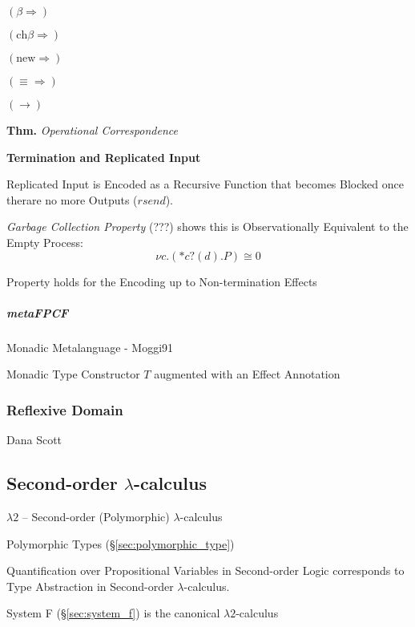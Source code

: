 $(\beta\Rightarrow)$

$(\text{ch}\beta\Rightarrow)$

$(\text{new}\Rightarrow)$

$(\equiv\Rightarrow)$

$(\rightarrow)$

\textbf{Thm.} \emph{Operational Correspondence}


\textbf{Termination and Replicated Input}

Replicated Input is Encoded as a Recursive Function that becomes
Blocked once therare no more Outputs ($rsend$).

\emph{Garbage Collection Property} (???) shows this is Observationally
Equivalent to the Empty Process:
\[
  \nu c.(*c?(d).P) \cong 0
\]

Property holds for the Encoding up to Non-termination Effects %



\subparagraph{metaFPCF}\label{sec:meta_fpcf}\hfill

\cite{orchard-yoshida16}

Monadic Metalanguage - Moggi91 %

Monadic Type Constructor $T$ augmented with an Effect Annotation
\cite{wadler-thiemann03}



\subsubsection{Reflexive Domain}\label{sec:reflexive_domain}

Dana Scott %



\subsection{Second-order $\lambda$-calculus}
\label{sec:secondorder_lambda}

$\lambda2$ -- Second-order (Polymorphic) $\lambda$-calculus

Polymorphic Types (\S\ref{sec:polymorphic_type})

Quantification over Propositional Variables in Second-order Logic
corresponds to Type Abstraction in Second-order $\lambda$-calculus.
\cite{wadler14}

System F (\S\ref{sec:system_f}) is the canonical $\lambda2$-calculus




